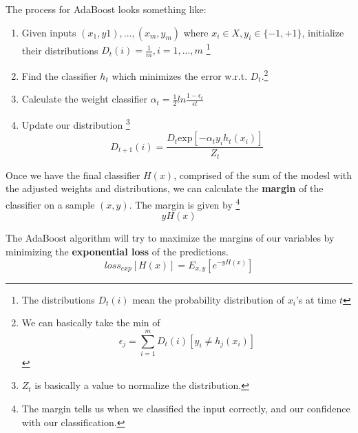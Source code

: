 \documentclass{tufte-handout}
\begin{document}
The process for AdaBoost looks something like:
\begin{enumerate}
	\item Given inputs $(x_{1}, y{1}),...,(x_{m},y_{m})$ where $x_{i} \in X, y_{i} \in\{-1, +1\}$,
			initialize their distributions $D_{t}(i)= \frac{1}{m}, i = 1,...,m$
			\footnote{The distributions $D_{t}(i)$ mean the probability distribution of $x_{i}$'s at time $t$}
	\item Find the classifier $h_{t}$ which minimizes the error w.r.t. $D_{t}$.\footnote{We can basically take
			the min of 
				\[\epsilon_{j} = \sum_{i = 1}^{m}D_{t}(i)[y_{i} \neq h_{j}(x_{i})]\]}
	\item Calculate the weight classifier $\alpha_{t} = \frac{1}{2}ln\frac{1 - \epsilon_{t}}{\epsilon{t}}$
	\item Update our distribution \footnote{ $Z_{t}$ is basically a value to normalize the distribution.}
			\[ D_{t + 1}(i) = \frac{D_{t}\textrm{exp}[-\alpha_{t}y_{i}h_{t}(x_{i})]}{Z_{t}} \]
\end{enumerate}

Once we have the final classifier $H(x)$, comprised of the sum of the modesl with the adjusted weights and
distributions, we can calculate the \textbf{margin} of the classifier on a sample $(x, y)$. The margin is
given by \footnote{The margin tells us when we classified the input correctly, and our confidence with our 
classification.}
\[yH(x)\]

The AdaBoost algorithm will try to maximize the margins of our variables by minimizing the 
\textbf{exponential loss} of the predictions.
\[loss_{exp}[H(x)]= E_{x,y}[e^{-yH(x)}]\]
\end{document}
